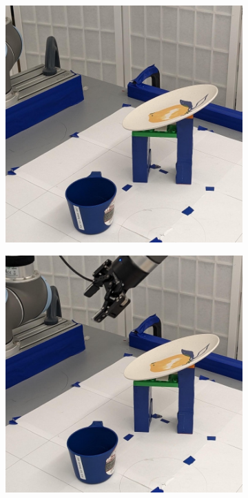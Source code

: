 \documentclass{article}
\begin{document}
\begin{figure}[]
    \centering

    \begin{subfigure}{(\linewidth - 0.05\linewidth)/5}
        \centering
        \includegraphics[width=\linewidth]{figures/episodes/bowl_on_mug/1.jpg}
    \end{subfigure}
    \begin{subfigure}{(\linewidth - 0.05\linewidth)/5}
        \centering
        \includegraphics[width=\linewidth]{figures/episodes/bowl_on_mug/2.jpg}

\end{subfigure}
\end{figure}
\end{document}
